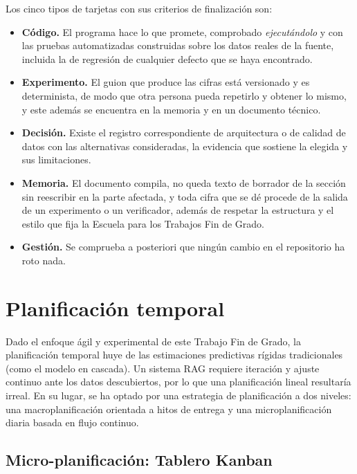 Los cinco tipos de tarjetas con sus criterios de finalización son:

\begin{itemize}                                                                                                                  
  \item \textbf{Código.} El programa hace lo que promete, comprobado
        \emph{ejecutándolo} y con las pruebas automatizadas construidas sobre los datos reales de la fuente,
        incluida la de regresión de cualquier defecto que se haya encontrado.
  \item \textbf{Experimento.} El guion que produce las cifras está
        versionado y es determinista, de modo que otra persona pueda repetirlo y obtener lo
        mismo, y este además se encuentra en la memoria y en un documento técnico.
  \item \textbf{Decisión.} Existe el registro correspondiente de arquitectura o de calidad de datos con las alternativas consideradas, la evidencia
        que sostiene la elegida y sus limitaciones.
  \item \textbf{Memoria.} El documento compila, no queda texto de
        borrador de la sección sin reescribir en la parte afectada, y toda cifra que se dé procede de la
        salida de un experimento o un verificador, además de
        respetar la estructura y el estilo que fija la Escuela para los Trabajos Fin
        de Grado\cite{epsj_criterios}.
  \item \textbf{Gestión.} Se comprueba a posteriori que ningún cambio en el repositorio ha roto nada.
\end{itemize}

\section{Planificación temporal}

Dado el enfoque ágil y experimental de este Trabajo Fin de Grado, la planificación temporal huye de las estimaciones predictivas rígidas tradicionales (como el modelo en cascada). Un sistema RAG requiere iteración y ajuste continuo ante los datos descubiertos, por lo que una planificación lineal resultaría irreal. En su lugar, se ha optado por una estrategia de planificación a dos niveles: una macroplanificación orientada a hitos de entrega y una microplanificación diaria basada en flujo continuo.

\subsection{Micro-planificación: Tablero Kanban}

